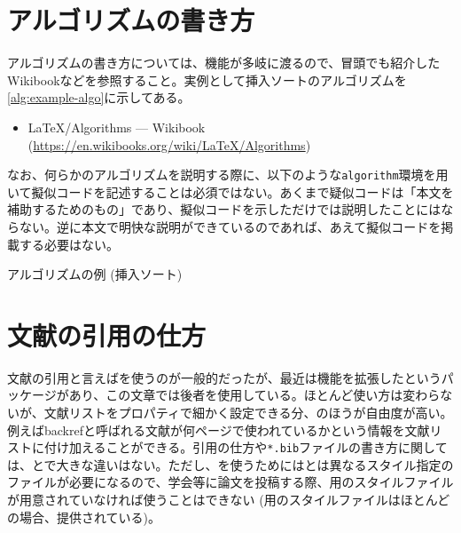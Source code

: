 \section{アルゴリズムの書き方}
\label{sec:write-algorithm}

アルゴリズムの書き方については、機能が多岐に渡るので、冒頭でも紹介したWikibookなどを参照すること。実例として挿入ソートのアルゴリズムを\cref{alg:example-algo}に示してある。
\begin{itemize}
  \item LaTeX/Algorithms --- Wikibook \\(\url{https://en.wikibooks.org/wiki/LaTeX/Algorithms})
\end{itemize}

なお、何らかのアルゴリズムを説明する際に、以下のような\texttt{algorithm}環境を用いて擬似コードを記述することは必須ではない。あくまで疑似コードは「本文を補助するためのもの」であり、擬似コードを示しただけでは説明したことにはならない。逆に本文で明快な説明ができているのであれば、あえて擬似コードを掲載する必要はない。

\begin{algorithm}[!h]
  \caption{アルゴリズムの例 (挿入ソート)}
  \label{alg:example-algo}
  \begin{algorithmic}[1]
            \EndWhile
        \EndFor
    \EndProcedure
  \end{algorithmic}
\end{algorithm}

\section{文献の引用の仕方}
\label{sec:cite-articles}

文献の引用と言えば\bibtex を使うのが一般的だったが、最近は機能を拡張した\biblatex というパッケージがあり、この文章では後者を使用している。ほとんど使い方は変わらないが、文献リストをプロパティで細かく設定できる分、\biblatex のほうが自由度が高い。例えばbackrefと呼ばれる文献が何ページで使われているかという情報を文献リストに付け加えることができる。引用の仕方や\texttt{*.bib}ファイルの書き方に関しては、\bibtex と\biblatex で大きな違いはない。ただし、\biblatex を使うためには\bibtex とは異なるスタイル指定のファイルが必要になるので、学会等に論文を投稿する際、\biblatex 用のスタイルファイルが用意されていなければ使うことはできない (\bibtex 用のスタイルファイルはほとんどの場合、提供されている)。

